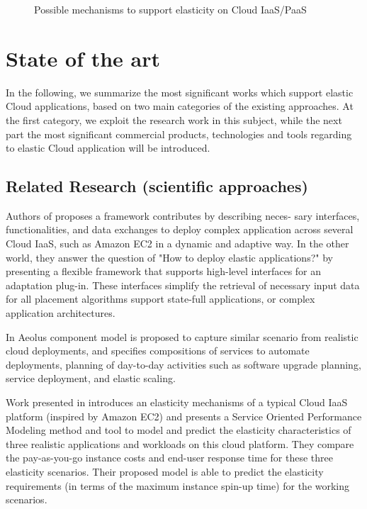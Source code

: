 \documentclass{sig-alternate}
\begin{document}
\begin{figure*}
\centering
{}
\caption{Possible mechanisms to support elasticity on Cloud IaaS/PaaS ~\cite{vaquero2011dynamically}}
\label{fig:scalabilitymechanisms}
\end{figure*}

\section{State of the art}\label{rw}
In the following, we summarize the most significant works which support elastic Cloud applications, based on two main categories of the existing approaches.
At the first category, we exploit the research work in this subject, while the next part the most significant commercial products, technologies and tools regarding to elastic Cloud application will be introduced.

\subsection{Related Research (scientific approaches)}
Authors of \cite{keller2013topology} proposes a framework contributes by describing neces-
sary interfaces, functionalities, and data exchanges to deploy complex application across several Cloud IaaS, such as Amazon EC2 in a dynamic and adaptive way. In the other world, they answer the question of "How to deploy elastic applications?" by presenting a flexible framework that supports high-level interfaces for an adaptation plug-in. These interfaces simplify the retrieval of necessary input data for all placement algorithms support state-full applications, or complex application architectures.

In \cite{di2012towards} Aeolus component model is proposed to capture similar scenario from realistic cloud deployments, and specifies compositions of services to automate deployments, planning of day-to-day activities such as software upgrade planning, service deployment, and elastic scaling.

Work presented in \cite{brebner2012your} introduces an elasticity mechanisms of a typical Cloud IaaS platform (inspired by Amazon EC2) and presents a Service Oriented Performance Modeling method and tool to model and predict the elasticity characteristics of three realistic applications and workloads on this cloud platform. They compare the pay-as-you-go instance costs and end-user response time for these three elasticity scenarios. Their proposed model is able to predict the elasticity requirements (in terms of the maximum instance spin-up time) for the working scenarios.
\end{document}
